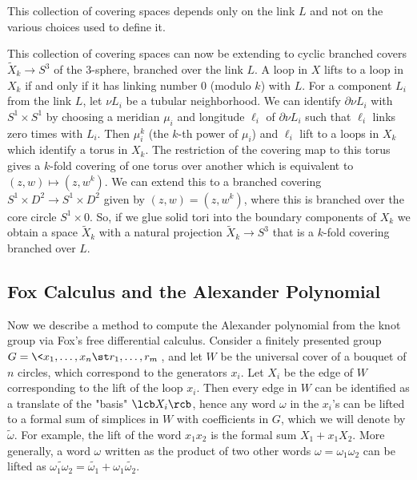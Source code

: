 This collection of covering spaces depends only on the link $L$ and not on the various choices used to define it. 

This collection of covering spaces can now be extending to cyclic branched covers $\tilde X_k \rightarrow S^3$ of the 3-sphere, branched over the link $L$. A loop in $X$ lifts to a loop in $X_k$ if and only if it has linking number 0 (modulo $k$) with $L$. For a component $L_i$ from the link $L$, let $\nu L_i$ be a tubular neighborhood. We can identify $\partial \nu L_i$ with $S^1 \times S^1$ by choosing a meridian $\mu_i$ and longitude $\ell_i$ of $\partial \nu L_i$ such that $\ell_i$ links zero times with $L_i$. Then $\mu_i^k$ (the $k$-th power of $\mu_i$) and $\ell_i$ lift to a loops in $X_k$ which identify a torus in $X_k$. The restriction of the covering map to this torus gives a $k$-fold covering of one torus over another which is equivalent to $(z,w) \mapsto (z,w^k)$. We can extend this to a branched covering $S^1 \times D^2 \rightarrow S^1 \times D^2$ given by $(z,w)=(z,w^k)$, where this is branched over the core circle $S^1 \times 0$. So, if we glue solid tori into the boundary components of $X_k$ we obtain a space $\tilde X_k$ with a natural projection $\tilde X_k \rightarrow S^3$ that is a $k$-fold covering branched over $L$.




\subsection{Fox Calculus and the Alexander Polynomial}
\label{Fox Calculus and the Alexander Polynomial}


Now we describe a method to compute the Alexander polynomial from the knot group via Fox's free differential calculus. Consider a finitely presented group $G = \< x_1,\ldots,x_n \st r_1,\ldots,r_m \>$, and let $W$ be the universal cover of a bouquet of $n$ circles, which correspond to the generators $x_i$. Let $X_i$ be the edge of $W$ corresponding to the lift of the loop $x_i$. Then every edge in $W$ can be identified as a translate of the "basis" $\lcb X_i \rcb$, hence any word $\omega$ in the $x_i$'s can be lifted to a formal sum of simplices in $W$ with coefficients in $G$, which we will denote by $\widetilde\omega$. For example, the lift of the word $x_1x_2$ is the formal sum $X_1 + x_1 X_2$. More generally, a word $\omega$ written as the product of two other words $\omega = \omega_1\omega_2$ can be lifted as $\widetilde{\omega_1\omega_2} = \widetilde{\omega_1} + \omega_1 \widetilde{\omega_2}$.


